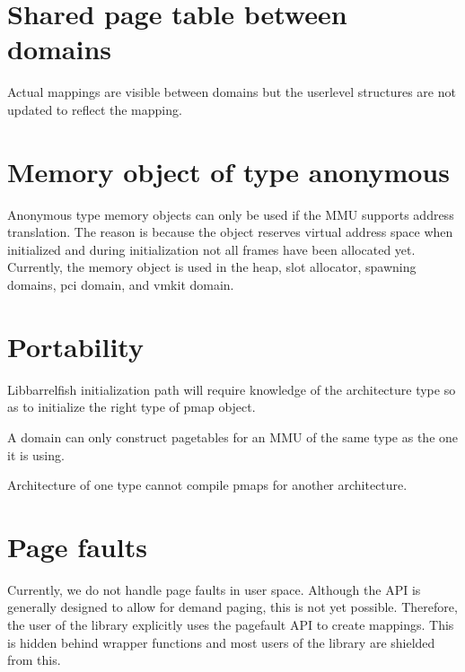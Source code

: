 \documentclass[a4paper,twoside]{report} %
\begin{document}
\section{Shared page table between domains}
Actual mappings are visible between domains
but the userlevel structures are not updated to reflect the mapping.

\section{Memory object of type anonymous}
Anonymous type memory objects can only be used if the MMU supports address translation.
The reason is because the object reserves virtual address space when initialized
and during initialization not all frames have been allocated yet.
Currently, the memory object is used in the heap, slot allocator, spawning domains, pci domain, and vmkit domain.

\section{Portability}
Libbarrelfish initialization path will require knowledge of the architecture type
so as to initialize the right type of pmap object.

A domain can only construct pagetables for an MMU of the same type as the one it is using.

Architecture of one type cannot compile pmaps for another architecture.

\section{Page faults}
Currently, we do not handle page faults in user space.
Although the API is generally designed to allow for demand paging, this is not yet possible.
Therefore, the user of the library explicitly uses the pagefault API to create mappings.
This is hidden behind wrapper functions and most users of the library are shielded from this.
\end{document}
